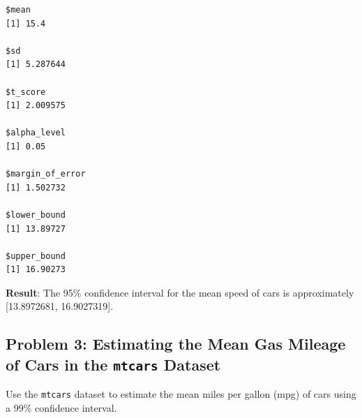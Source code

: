 \documentclass[
  letterpaper,
  DIV=11,
  numbers=noendperiod]{scrreprt}
\begin{document}
\begin{verbatim}
$mean
[1] 15.4

$sd
[1] 5.287644

$t_score
[1] 2.009575

$alpha_level
[1] 0.05

$margin_of_error
[1] 1.502732

$lower_bound
[1] 13.89727

$upper_bound
[1] 16.90273
\end{verbatim}

\textbf{Result}: The 95\% confidence interval for the mean speed of cars
is approximately {[}13.8972681, 16.9027319{]}.

\subsection*{\texorpdfstring{Problem 3: Estimating the Mean Gas Mileage
of Cars in the \texttt{mtcars}
Dataset}{Problem 3: Estimating the Mean Gas Mileage of Cars in the mtcars Dataset}}\label{problem-3-estimating-the-mean-gas-mileage-of-cars-in-the-mtcars-dataset}

Use the \texttt{mtcars} dataset to estimate the mean miles per gallon
(mpg) of cars using a 99\% confidence interval.
\end{document}
